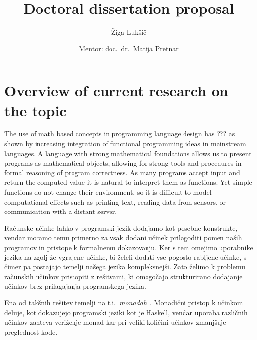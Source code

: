 \documentclass{article}
\title{Doctoral dissertation proposal}
\author{Žiga Lukšič \and Mentor: doc.\ dr.\ Matija Pretnar}
\date{}
\newcommand{\todo}[1]{{\color{red}{#1}}}
\begin{document}
\maketitle

\vspace{-10mm}
\begin{center}
  \Large{\textsc{\textbf{\todo{???}}}}

  \Large{\textsc{\textbf{\todo{??? but in english}}}}
\end{center}

\section*{Overview of current research on the topic}

The use of math based concepts in programming language design has ??? as shown by increasing integration of functional programming ideas in mainstream languages. A language with strong mathematical foundations allows us to present programs as mathematical objects, allowing for strong tools and procedures in formal reasoning of program correctness. As many programs accept input and return the computed value it is natural to interpret them as functions. Yet simple functions do not change their environment, so it is difficult to model computational effects such as printing text, reading data from sensors, or communication with a distant server.



Računske učinke lahko v programski jezik dodajamo kot posebne konstrukte, vendar moramo temu primerno za vsak dodani učinek prilagoditi pomen naših programov in pristope k formalnemu dokazovanju. Ker s tem omejimo uporabnike jezika na zgolj že vgrajene učinke, bi želeli dodati vse pogosto rabljene učinke, s čimer pa postajajo temelji našega jezika kompleksnejši. Zato želimo k problemu računskih učinkov pristopiti z rešitvami, ki omogočajo strukturirano dodajanje učinkov brez prilagajanja programskega jezika.


Ena od takšnih rešitev temelji na t.i.\ \emph{monadah}~\cite{DBLP:journals/iandc/Moggi91}. Monadični pristop k učinkom deluje, kot dokazujejo programski jeziki kot je Haskell, vendar uporaba različnih učinkov zahteva veriženje monad kar pri veliki količini učinkov zmanj\-šuje preglednost kode.
\end{document}
